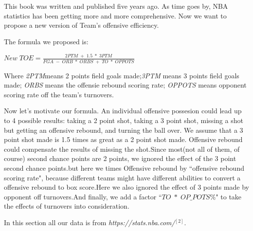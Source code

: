 \documentclass[11pt]{article}
\begin{document}
This book was written and published five years ago. As time goes by, NBA statistics has been getting more and more comprehensive.
Now we want to propose a new version of Team's offensive efficiency.

The formula we proposed is:
\begin{center}
$New\;TOE = \frac{2PTM \;+ \;1.5 \;* \;3PTM}{FGA \;-\; ORB \;*\; ORBS \; + \;TO\; * \;OPPOTS}$
\end{center}
Where \textit{2PTM}means 2 points field goals made;\textit{3PTM} means 3 points field goals made; \textit{ORBS} means the offensie rebound scoring rate; \textit{OPPOTS} means opponent scoring rate off the team's turnovers.

Now let's motivate our formula. An individual offensive possesion could lead up to 4 possible results: taking a 2 point shot, taking a 3 point shot, missing a shot but getting an offensive rebound, and turning the ball over. We assume that a 3 point shot made is 1.5 times as great as a 2 point shot made. Offensive rebound could compensate the results of missing the shot.Since most(not all of them, of course) second chance points are 2 points, we ignored the effect of the 3 point second chance points.but here we times Offensive rebound by ``offensive rebound scoring rate", because different teams might have different abilities to convert a offensive rebound to box score.Here we also ignored the effect of 3 points made by opponent off turnovers.And finally, we add a factor ``$TO\; * \;OP\_POTS\%$" to take the effects of turnovers into consideration.

In this section all our data is from \textit{https://stats.nba.com/}$^{[2]}$.
\end{document}
